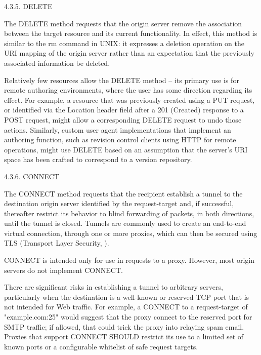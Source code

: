   
    
    4.3.5.  DELETE
    
       The DELETE method requests that the origin server remove the
       association between the target resource and its current
       functionality.  In effect, this method is similar to the rm command
       in UNIX: it expresses a deletion operation on the URI mapping of the
       origin server rather than an expectation that the previously
       associated information be deleted.
    
      
    
       Relatively few resources allow the DELETE method -- its primary use
       is for remote authoring environments, where the user has some
       direction regarding its effect.  For example, a resource that was
       previously created using a PUT request, or identified via the
       Location header field after a 201 (Created) response to a POST
       request, might allow a corresponding DELETE request to undo those
       actions.  Similarly, custom user agent implementations that implement an authoring function, such as revision control clients using HTTP
       for remote operations, might use DELETE based on an assumption that
       the server's URI space has been crafted to correspond to a version
       repository.
    
      
    
    4.3.6.  CONNECT
    
       The CONNECT method requests that the recipient establish a tunnel to
       the destination origin server identified by the request-target and,
       if successful, thereafter restrict its behavior to blind forwarding
       of packets, in both directions, until the tunnel is closed.  Tunnels
       are commonly used to create an end-to-end virtual connection, through
       one or more proxies, which can then be secured using TLS (Transport
       Layer Security, ).
    
       CONNECT is intended only for use in requests to a proxy.  
         However, most origin servers do not implement CONNECT.
     
    
       There are significant risks in establishing a tunnel to arbitrary
       servers, particularly when the destination is a well-known or
       reserved TCP port that is not intended for Web traffic.  For example,
       a CONNECT to a request-target of "example.com:25" would suggest that
       the proxy connect to the reserved port for SMTP traffic; if allowed,
       that could trick the proxy into relaying spam email.  Proxies that
       support CONNECT SHOULD restrict its use to a limited set of known
       ports or a configurable whitelist of safe request targets.
    
